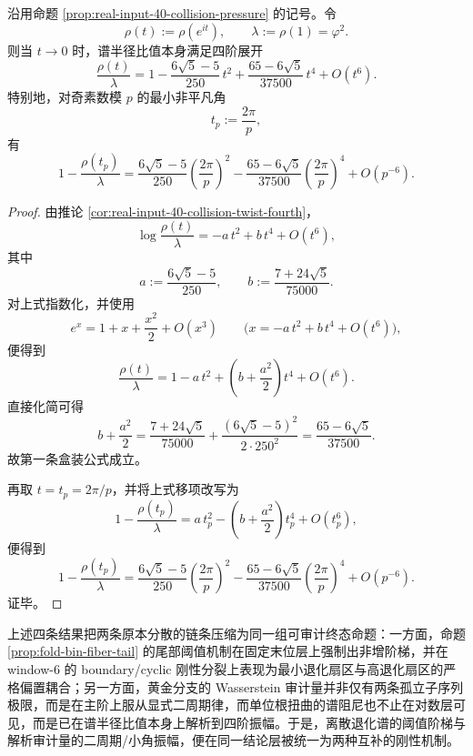 \begin{theorem}[单位根扭曲的谱半径比值具有显式四阶振幅展开]\label{thm:conclusion-collision-unit-root-spectral-ratio-fourth-order}
沿用命题 \ref{prop:real-input-40-collision-pressure} 的记号。令
\[
\rho(t):=\rho(e^{it}),
\qquad
\lambda:=\rho(1)=\varphi^2.
\]
则当 \(t\to 0\) 时，谱半径比值本身满足四阶展开
\[
\boxed{\;
\frac{\rho(t)}{\lambda}
=
1-\frac{6\sqrt5-5}{250}\,t^2
+\frac{65-6\sqrt5}{37500}\,t^4
+O(t^6).\;}
\]
特别地，对奇素数模 \(p\) 的最小非平凡角
\[
t_p:=\frac{2\pi}{p},
\]
有
\[
\boxed{\;
1-\frac{\rho(t_p)}{\lambda}
=
\frac{6\sqrt5-5}{250}\left(\frac{2\pi}{p}\right)^2
-\frac{65-6\sqrt5}{37500}\left(\frac{2\pi}{p}\right)^4
+O(p^{-6}).\;}
\]
\end{theorem}
\begin{proof}
由推论 \ref{cor:real-input-40-collision-twist-fourth}，
\[
\log\frac{\rho(t)}{\lambda}
=
-a\,t^2+b\,t^4+O(t^6),
\]
其中
\[
a:=\frac{6\sqrt5-5}{250},
\qquad
b:=\frac{7+24\sqrt5}{75000}.
\]
对上式指数化，并使用
\[
e^x=1+x+\frac{x^2}{2}+O(x^3)
\qquad
\bigl(x=-a\,t^2+b\,t^4+O(t^6)\bigr),
\]
便得到
\[
\frac{\rho(t)}{\lambda}
=
1-a\,t^2+\left(b+\frac{a^2}{2}\right)t^4+O(t^6).
\]
直接化简可得
\[
b+\frac{a^2}{2}
=
\frac{7+24\sqrt5}{75000}
+\frac{(6\sqrt5-5)^2}{2\cdot 250^2}
=
\frac{65-6\sqrt5}{37500}.
\]
故第一条盒装公式成立。

再取 \(t=t_p=2\pi/p\)，并将上式移项改写为
\[
1-\frac{\rho(t_p)}{\lambda}
=
a\,t_p^2-\left(b+\frac{a^2}{2}\right)t_p^4+O(t_p^6),
\]
便得到
\[
1-\frac{\rho(t_p)}{\lambda}
=
\frac{6\sqrt5-5}{250}\left(\frac{2\pi}{p}\right)^2
-\frac{65-6\sqrt5}{37500}\left(\frac{2\pi}{p}\right)^4
+O(p^{-6}).
\]
证毕。
\end{proof}

上述四条结果把两条原本分散的链条压缩为同一组可审计终态命题：一方面，命题 \ref{prop:fold-bin-fiber-tail} 的尾部阈值机制在固定末位层上强制出非增阶梯，并在 window-\(6\) 的 boundary/cyclic 刚性分裂上表现为最小退化扇区与高退化扇区的严格偏置耦合；另一方面，黄金分支的 Wasserstein 审计量并非仅有两条孤立子序列极限，而是在主阶上服从显式二周期律，而单位根扭曲的谱阻尼也不止在对数层可见，而是已在谱半径比值本身上解析到四阶振幅。于是，离散退化谱的阈值阶梯与解析审计量的二周期/小角振幅，便在同一结论层被统一为两种互补的刚性机制。

\endinput
